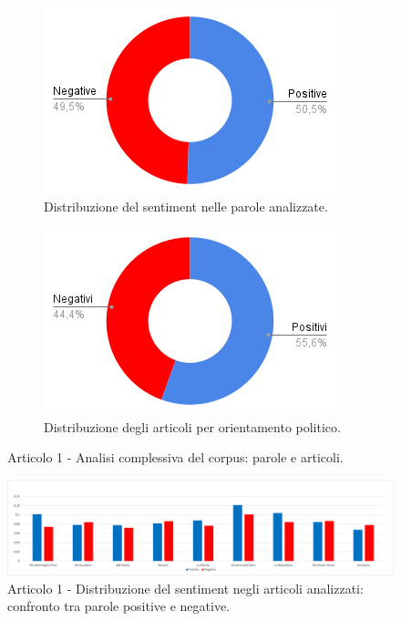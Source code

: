 \begin{figure}[H]
    \centering
    \begin{subfigure}[t]{0.48\textwidth}
        \centering
        \includegraphics[width=\linewidth]{Immagini//Articolo1/Articolo 1 - Rapporto Totale Parole.png}
        \caption{Distribuzione del sentiment nelle parole analizzate.}
        \label{fig:totale-parole-a1}
    \end{subfigure}
    \hfill
    \begin{subfigure}[t]{0.48\textwidth}
        \centering
        \includegraphics[width=\linewidth]{Immagini//Articolo1/Articolo 1 - Rapporto Totale Articoli.png}
        \caption{Distribuzione degli articoli per orientamento politico.}
        \label{fig:totale-articoli-a1}
    \end{subfigure}
    \caption{Articolo 1 - Analisi complessiva del corpus: parole e articoli.}
    \label{fig:analisi-totale-a1}

    \centering
    \includegraphics[width=1\linewidth]{Immagini//Articolo1/Articolo 1 - Analisi Grafica Risultati Totali.png}
    \caption{Articolo 1 - Distribuzione del sentiment negli articoli analizzati: confronto tra parole positive e negative.}
    \label{fig:risultati-totali-a1}
\end{figure}

